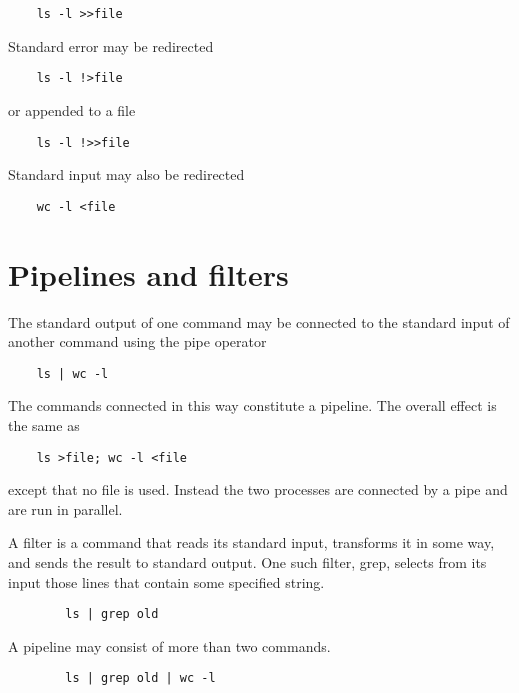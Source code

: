 \documentclass[12pt]{book}
\begin{document}
\begin{lstlisting}
	ls -l >>file
\end{lstlisting}

Standard error may be redirected

\begin{lstlisting}
	ls -l !>file
\end{lstlisting}

or appended to a file

\begin{lstlisting}
	ls -l !>>file
\end{lstlisting}

Standard input may also be redirected

\begin{lstlisting}
	wc -l <file
\end{lstlisting}


\section{Pipelines and filters}

The standard output of one command may be connected to the standard
input of another command using the pipe operator

\begin{lstlisting}
	ls | wc -l
\end{lstlisting}

The commands connected in this way constitute a pipeline. The
overall effect is the same as

\begin{lstlisting}
	ls >file; wc -l <file
\end{lstlisting}

except that no file is used. Instead the two processes are connected
by a pipe and are run in parallel.

A filter is a command that reads its standard input, transforms it
in some way, and sends the result to standard output. One such filter,
grep, selects from its input those lines that contain some specified
string. 

\begin{lstlisting}
    	ls | grep old
\end{lstlisting}

A pipeline may consist of more than two commands.

\begin{lstlisting}
    	ls | grep old | wc -l
\end{lstlisting}
\end{document}
